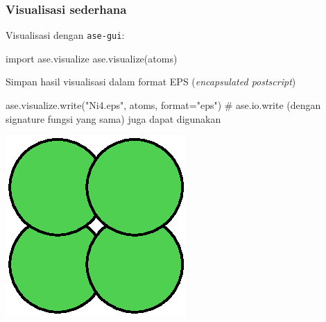\documentclass[bahasa,10pt]{beamer}
\begin{document}
\begin{frame}[fragile]
\frametitle{Visualisasi sederhana}

Visualisasi dengan \texttt{ase-gui}:
\begin{pythoncode}
import ase.visualize
ase.visualize(atoms)
\end{pythoncode}

Simpan hasil visualisasi dalam format EPS (\textit{encapsulated postscript})
\begin{pythoncode}
ase.visualize.write("Ni4.eps", atoms, format="eps")
# ase.io.write (dengan signature fungsi yang sama) juga dapat digunakan
\end{pythoncode}

{\centering
\includegraphics[scale=0.4]{Ni4.eps}
\par}

\end{frame}
\end{document}
